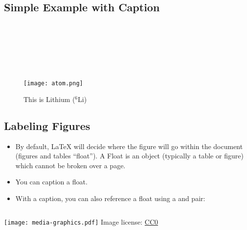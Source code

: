 \documentclass[usenames,dvipsnames]{beamer}
\begin{document}
\subsection{Simple Example with Caption}
\begin{frame}[fragile]{\insertsubsection}

\\
\\
\\
\\
\\


\begin{figure}
\centering
\texttt{[image: atom.png]}
\caption{This is Lithium (${}^{6}$Li)}
\end{figure}

\end{frame}
\subsection[fragile]{Labeling Figures}
\begin{frame}{\insertsubsection}
\begin{itemize}
\item By default, \LaTeX{} will decide where the figure will go within the document (figures and tables ``float''). A Float is an object (typically a table or figure) which cannot be broken over a page.
\item You can caption a float. 
\item With a caption, you can also reference a float using a  and  pair:
\end{itemize}
\begin{minipage}{0.45\linewidth}
\inputminted[fontsize=\tiny,frame=single,resetmargins]{latex}{media-graphics.tex}
\end{minipage}
\begin{minipage}{0.5\linewidth}
\texttt{[image: media-graphics.pdf]}
\tiny{Image license: \href{https://pixabay.com/en/animal-apple-attractive-beautiful-1239390/}{CC0}}
\end{minipage}


\end{frame}
\end{document}
